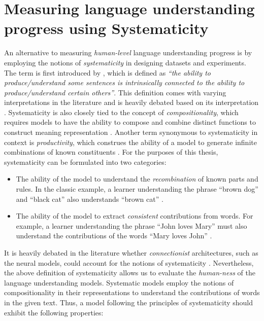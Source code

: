 \documentclass[letterpaper, 12pt]{report}
\begin{document}
\section{Measuring language understanding progress using Systematicity}
\label{sec:bg_systematicity}

An alternative to measuring \textit{human-level} language understanding progress is by employing the notions of \textit{systematicity} in designing datasets and experiments.
The term is first introduced by \citet{fodor1988connectionism}, which is defined as \textit{``the ability to produce/understand some sentences is intrinsically connected to the ability to produce/understand certain others''}. This definition comes with varying interpretations in the literature \citep{Lake2018:SCAN,bahdanau2018systematic, goodwin-etal-2020-probing} and is heavily debated based on its interpretation \citep{szabo2012case,herbelot2020how}. Systematicity is also closely tied to the concept of \textit{compositionality}, which requires models to have the ability to compose and combine distinct functions to construct meaning representation \citep{kratzer1998semantics,szabo2012case}. Another term synonymous to systematicity in context is \textit{productivity}, which construes the ability of a model to generate infinite combinations of known constituents \citep{pullum2010recursion}.
For the purposes of this thesis, systematicity can be formulated into two categories:

\begin{itemize}
  \item The ability of the model to understand the \textit{recombination} of known parts and rules. In the classic example, a learner understanding the phrase ``brown dog'' and ``black cat'' also understands ``brown cat'' \citep{hupkes2020}.
  \item The ability of the model to extract \textit{consistent} contributions from words. For example, a learner understanding the phrase ``John loves Mary'' must also understand the contributions of the words ``Mary loves John'' \citep{goodwin-etal-2020-probing}.
\end{itemize}

It is heavily debated in the literature whether \textit{connectionist} architectures, such as the neural models, could account for the notions of systematicity \citep{fodor1988connectionism, smolensky1991constituent, marcus1998rethinking}. Nevertheless, the above definition of systematicity allows us to evaluate the \textit{human-ness} of the language understanding models. Systematic models employ the notions of compositionality in their representations to understand the contributions of words in the given text. Thus, a model following the principles of systematicity should exhibit the following properties:
\end{document}
